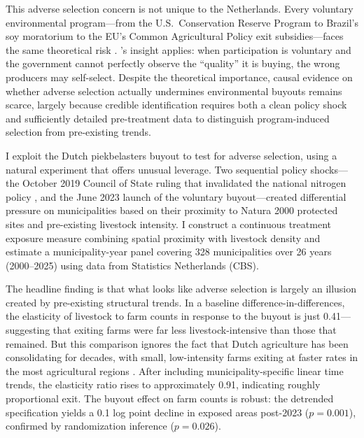 \documentclass[12pt]{article}
\begin{document}
This adverse selection concern is not unique to the Netherlands. Every voluntary environmental program---from the U.S.\ Conservation Reserve Program to Brazil's soy moratorium to the EU's Common Agricultural Policy exit subsidies---faces the same theoretical risk \citep{wu2001slippage, jack2008designing, ferraro2011future}. \citet{akerlof1970market}'s insight applies: when participation is voluntary and the government cannot perfectly observe the ``quality'' it is buying, the wrong producers may self-select. Despite the theoretical importance, causal evidence on whether adverse selection actually undermines environmental buyouts remains scarce, largely because credible identification requires both a clean policy shock and sufficiently detailed pre-treatment data to distinguish program-induced selection from pre-existing trends.

I exploit the Dutch piekbelasters buyout to test for adverse selection, using a natural experiment that offers unusual leverage. Two sequential policy shocks---the October 2019 Council of State ruling that invalidated the national nitrogen policy \citep{stokstad2023nitrogen}, and the June 2023 launch of the voluntary buyout---created differential pressure on municipalities based on their proximity to Natura 2000 protected sites and pre-existing livestock intensity. I construct a continuous treatment exposure measure combining spatial proximity with livestock density and estimate a municipality-year panel covering 328 municipalities over 26 years (2000--2025) using data from Statistics Netherlands (CBS).

The headline finding is that what looks like adverse selection is largely an illusion created by pre-existing structural trends. In a baseline difference-in-differences, the elasticity of livestock to farm counts in response to the buyout is just 0.41---suggesting that exiting farms were far less livestock-intensive than those that remained. But this comparison ignores the fact that Dutch agriculture has been consolidating for decades, with small, low-intensity farms exiting at faster rates in the most agricultural regions \citep{claassen2018targeting}. After including municipality-specific linear time trends, the elasticity ratio rises to approximately 0.91, indicating roughly proportional exit. The buyout effect on farm counts is robust: the detrended specification yields a 0.1 log point decline in exposed areas post-2023 ($p = 0.001$), confirmed by randomization inference ($p = 0.026$).
\end{document}

